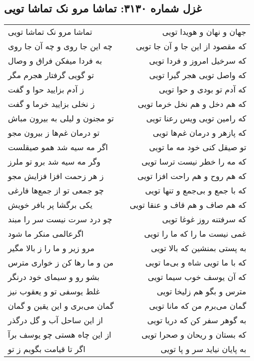 \begin{center}
\section*{غزل شماره ۳۱۳۰: تماشا مرو نک تماشا تویی}
\label{sec:3130}
\begin{longtable}{l p{0.5cm} r}
تماشا مرو نک تماشا تویی
&&
جهان و نهان و هویدا تویی
\\
چه این جا روی و چه آن جا روی
&&
که مقصود از این جا و آن جا تویی
\\
به فردا میفکن فراق و وصال
&&
که سرخیل امروز و فردا تویی
\\
تو گویی گرفتار هجرم مگر
&&
که واصل تویی هجر گیرا تویی
\\
ز آدم بزایید حوا و گفت
&&
که آدم تو بودی و حوا تویی
\\
ز نخلی بزایید خرما و گفت
&&
که هم دخل و هم نخل خرما تویی
\\
تو مجنون و لیلی به بیرون مباش
&&
که رامین تویی ویس رعنا تویی
\\
تو درمان غم‌ها ز بیرون مجو
&&
که پازهر و درمان غم‌ها تویی
\\
اگر مه سیه شد همو صیقلست
&&
تو صیقل کنی خود مه ما تویی
\\
وگر مه سیه شد برو تو ملرز
&&
که مه را خطر نیست ترسا تویی
\\
ز هر زحمت افزا فزایش مجو
&&
که هم روح و هم راحت افزا تویی
\\
چو جمعی تو از جمع‌ها فارغی
&&
که با جمع و بی‌جمع و تنها تویی
\\
یکی برگشا پر بافر خویش
&&
که هم صاف و هم قاف و عنقا تویی
\\
چو درد سرت نیست سر را مبند
&&
که سرفتنه روز غوغا تویی
\\
اگرعالمی منکر ما شود
&&
غمی نیست ما را که ما را تویی
\\
مرو زیر و ما را ز بالا مگیر
&&
به پستی بمنشین که بالا تویی
\\
من و ما رها کن ز خواری مترس
&&
که با ما تویی شاه و بی‌ما تویی
\\
بشو رو و سیمای خود درنگر
&&
که آن یوسف خوب سیما تویی
\\
غلط یوسفی تو و یعقوب نیز
&&
مترس و بگو هم زلیخا تویی
\\
گمان می‌بری و این یقین و گمان
&&
گمان می‌برم من که مانا تویی
\\
از این ساحل آب و گل درگذر
&&
به گوهر سفر کن که دریا تویی
\\
از این چاه هستی چو یوسف برآ
&&
که بستان و ریحان و صحرا تویی
\\
اگر تا قیامت بگویم ز تو
&&
به پایان نیاید سر و پا تویی
\\
\end{longtable}
\end{center}
